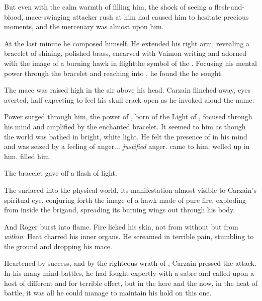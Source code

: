 But even with the calm warmth of \iquin{} filling him, the shock of seeing a flesh-and-blood, mace-swinging attacker rush at him had caused him to hesitate precious moments, and the mercenary was almost upon him. 

At the last minute he composed himself. 
He extended his right arm, revealing a bracelet of shining, polished brass, encarved with Vaimon writing and adorned with the image of a burning hawk in flight\dash the symbol of the \Sephirah{} . 
Focusing his mental power through the bracelet and reaching into \iquin{}, he found the \Sephirah{} he sought. 

The mace was raised high in the air above his head. 
Carzain flinched away, eyes averted, half-expecting to feel his skull crack open as he invoked aloud the name: 
\talk{\Izion!} 

Power surged through him, the power of \Izion, born of the Light of \iquin{}, focused through his mind and amplified by the enchanted bracelet. 
It seemed to him as though the world was bathed in bright, white light. He felt the presence of \Izion{} in his mind and was seized by a feeling of anger... \emph{justified} anger. 
\Izion{} came to him. 
\Izion{} welled up in him. 
\Izion{} filled him. 


The bracelet gave off a flash of light. 

The \sephirah{} surfaced into the physical world, its manifestation almost visible to Carzain's spiritual eye, conjuring forth the image of a hawk made of pure fire, exploding from inside the brigand, spreading its burning wings out through his body. 

And Roger burst into flame. 
Fire licked his skin, not from without but from \emph{within}. 
Heat charred his inner organs. 
He screamed in terrible pain, stumbling to the ground and dropping his mace. 

Heartened by success, and by the righteous wrath of \Izion, Carzain pressed the attack. 
In his many mind-battles, he had fought expertly with a sabre and called upon a host of different \Sephiroth{} and \Qliphoth{} for terrible effect, but in the here and the now, in the heat of battle, it was all he could manage to maintain his hold on this one. 

